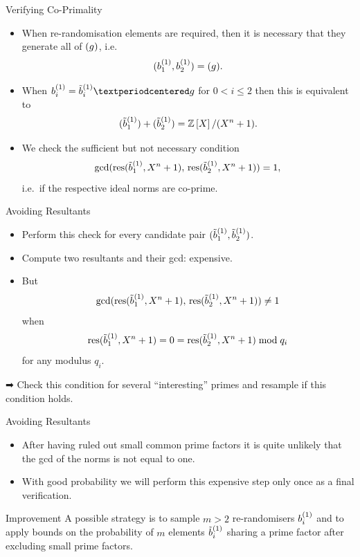 \documentclass[presentation,smaller]{beamer}
\begin{document}
\begin{frame}[label={sec:orgheadline31}]{Verifying Co-Primality}
\begin{itemize}
\item When re-randomisation elements are required, then it is necessary that they generate all of \(\ideal{g}\), i.e. \[(\b[1]{1},\b[2]{1}) = (g).\]
\item When \(\b[i]{1} = \bt[i]{1}·g\) for \(0 < i \leq 2\) then this is equivalent to \[(\bt[1]{1}) + (\bt[2]{1}) = \Z[X]/(\cycf).\]
\item We check the sufficient but not necessary condition \[\gcd(\res(\bt[1]{1},X^n+1),\, \res(\bt[2]{1},X^n+1)) = 1,\] i.e. if the respective ideal norms are co-prime.
\end{itemize}
\end{frame}

\begin{frame}[label={sec:orgheadline32}]{Avoiding Resultants}
\begin{itemize}
\item Perform this check for every candidate pair \((\bt[1]{1},\bt[2]{1})\).
\item Compute two resultants and their gcd: \alert{expensive}.
\item But \[\gcd(\res(\bt[1]{1}, X^n+1),\, \res(\bt[2]{1},X^n+1)) \neq 1\] when \[\res(\bt[1]{1},X^n+1) = 0 = \res(\bt[2]{1},X^n+1) \bmod q_i\] for any modulus \(q_i\).
\end{itemize}

➡ Check this condition for several “interesting” primes and resample if this condition holds.
\end{frame}

\begin{frame}[label={sec:orgheadline33}]{Avoiding Resultants}
\begin{itemize}
\item After having ruled out small common prime factors it is quite unlikely that the gcd of the norms is not equal to one.
\item With good probability we will perform this expensive step only once as a final verification.
\end{itemize}

\begin{block}{Improvement}
A possible strategy is to sample \(m>2\) re-randomisers \(\b[i]{1}\) and to apply bounds on the probability of \(m\) elements \(\bt[i]{1}\) sharing a prime factor after excluding small prime factors.
\end{block}
\end{frame}
\end{document}
